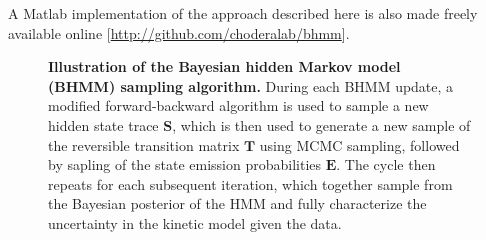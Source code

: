 \documentclass[aps,pre,twocolumn,superscriptaddress,nofootinbib,longbibliography]{revtex4-1}
\begin{document}
{{%
A Matlab implementation of the approach described here is also made freely available online [\url{http://github.com/choderalab/bhmm}].
}

\begin{figure}[tb]
\noindent
{}
\caption{{\bf Illustration of the Bayesian hidden Markov model (BHMM) sampling algorithm.}
During each BHMM update, a modified forward-backward algorithm is used to sample a new hidden state trace $\mathbf{S}$, which is then used to generate a new sample of the reversible transition matrix $\mathbf{T}$ using MCMC sampling, followed by sapling of the state emission probabilities $\mathbf{E}$.
The cycle then repeats for each subsequent iteration, which together sample from the Bayesian posterior of the HMM and fully characterize the uncertainty in the kinetic model given the data.
\label{figure:bhmm-workflow}}
\end{figure}


}
\end{document}
